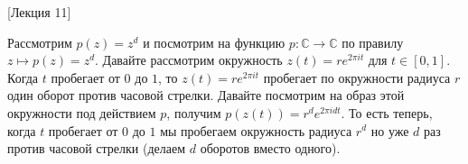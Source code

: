 [Лекция 11]


\begin{example}
[V.I.P. пример]
Рассмотрим $p(z) = z^d$ и посмотрим на функцию $p\colon \mathbb C\to \mathbb C$ по правилу $z \mapsto p(z) = z^d$.
Давайте рассмотрим окружность $z(t) = r e^{2\pi i t}$ для $t\in [0, 1]$.
Когда $t$ пробегает от $0$ до $1$, то $z(t) = r e^{2\pi i t}$ пробегает по окружности радиуса $r$ один оборот против часовой стрелки.
Давайте посмотрим на образ этой окружности под действием $p$, получим $p(z(t)) = r^d e^{2\pi i d t}$.
То есть теперь, когда $t$ пробегает от $0$ до $1$ мы пробегаем окружность радиуса $r^d$ но уже $d$ раз против часовой стрелки (делаем $d$ оборотов вместо одного).
\end{example}


